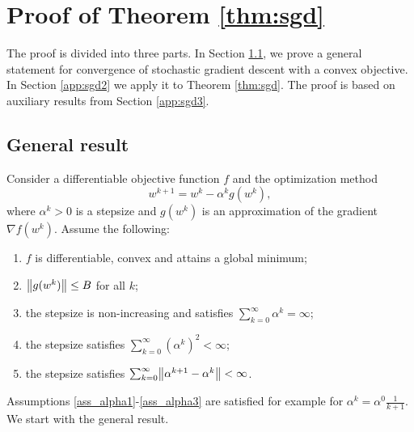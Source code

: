 \section{Proof of Theorem \ref{thm:sgd}}

The proof is divided into three parts. In Section \ref{app:sgd1}, we prove a general statement for convergence of stochastic gradient descent with a convex objective. In Section \ref{app:sgd2} we apply it to Theorem \ref{thm:sgd}. The proof is based on auxiliary results from Section \ref{app:sgd3}.

\subsection{General result}\label{app:sgd1}

Consider a differentiable objective function $f$ and the optimization method
\begin{equation}\label{eq:update}
  w^{k+1}=w^k-\alpha^kg(w^k),
\end{equation}
where $\alpha^k>0$ is a stepsize and $g(w^k)$ is an approximation of the gradient $\nabla f(w^k)$. Assume the following:
\begin{enumerate}[label={(A\arabic*)}]
  \item \label{ass_convex} $f$ is differentiable, convex and attains a global minimum;
  \item \label{ass_gbound} $\norm{g(w^k)}\le B$ for all $k$;
  \item \label{ass_alpha1} the stepsize is non-increasing and satisfies $\sum_{k=0}^\infty \alpha^k=\infty$;
  \item \label{ass_alpha2} the stepsize satisfies $\sum_{k=0}^\infty (\alpha^k)^2<\infty$;
  \item \label{ass_alpha3} the stepsize satisfies $\sum_{k=0}^\infty \nrm{\alpha^{k+1}-\alpha^k}<\infty$.
\end{enumerate}
Assumptions \ref{ass_alpha1}-\ref{ass_alpha3} are satisfied for example for $\alpha^k=\alpha^0\frac{1}{k+1}$. We start with the general result.

